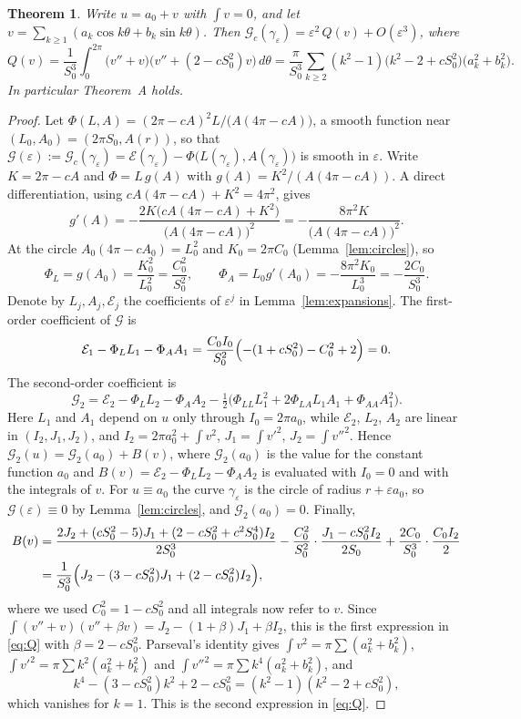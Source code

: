 \documentclass[11pt]{amsart}
\newtheorem{theorem}{Theorem}[section]
\theoremstyle{definition}
\theoremstyle{remark}
\numberwithin{equation}{section}
\newcommand{\eps}{\varepsilon}
\newcommand{\E}{\mathcal{E}}
\newcommand{\G}{\mathcal{G}}
\begin{document}
\begin{theorem}\label{thm:second}
Write $u=a_0+v$ with $\int v=0$, and let $v=\sum_{k\ge1}(a_k\cos k\theta+b_k\sin k\theta)$. Then $\G_c(\gamma_\eps)=\eps^2\,Q(v)+O(\eps^3)$, where
\begin{equation}\label{eq:Q}
Q(v)=\frac1{S_0^3}\int_0^{2\pi}\bigl(v''+v\bigr)\bigl(v''+(2-cS_0^2)v\bigr)\,d\theta
=\frac{\pi}{S_0^3}\sum_{k\ge2}(k^2-1)\bigl(k^2-2+cS_0^2\bigr)\bigl(a_k^2+b_k^2\bigr).
\end{equation}
In particular Theorem~A holds.
\end{theorem}

\begin{proof}
Let $\Phi(L,A)=(2\pi-cA)^2L/\bigl(A(4\pi-cA)\bigr)$, a smooth function near $(L_0,A_0)=(2\pi S_0,A(r))$, so that $\G(\eps):=\G_c(\gamma_\eps)=\E(\gamma_\eps)-\Phi\bigl(L(\gamma_\eps),A(\gamma_\eps)\bigr)$ is smooth in $\eps$. Write $K=2\pi-cA$ and $\Phi=L\,g(A)$ with $g(A)=K^2/(A(4\pi-cA))$. A direct differentiation, using $cA(4\pi-cA)+K^2=4\pi^2$, gives
\[
g'(A)=-\frac{2K\bigl(cA(4\pi-cA)+K^2\bigr)}{\bigl(A(4\pi-cA)\bigr)^2}=-\frac{8\pi^2K}{\bigl(A(4\pi-cA)\bigr)^2}.
\]
At the circle $A_0(4\pi-cA_0)=L_0^2$ and $K_0=2\pi C_0$ (Lemma~\ref{lem:circles}), so
\[
\Phi_L=g(A_0)=\frac{K_0^2}{L_0^2}=\frac{C_0^2}{S_0^2},\qquad \Phi_A=L_0g'(A_0)=-\frac{8\pi^2K_0}{L_0^3}=-\frac{2C_0}{S_0^3}.
\]
Denote by $L_j,A_j,\E_j$ the coefficients of $\eps^j$ in Lemma~\ref{lem:expansions}. The first-order coefficient of $\G$ is
\[
\E_1-\Phi_LL_1-\Phi_AA_1=\frac{C_0I_0}{S_0^2}\Bigl(-(1+cS_0^2)-C_0^2+2\Bigr)=0 .
\]
The second-order coefficient is
\[
\G_2=\E_2-\Phi_LL_2-\Phi_AA_2-\tfrac12\bigl(\Phi_{LL}L_1^2+2\Phi_{LA}L_1A_1+\Phi_{AA}A_1^2\bigr).
\]
Here $L_1$ and $A_1$ depend on $u$ only through $I_0=2\pi a_0$, while $\E_2$, $L_2$, $A_2$ are linear in $(I_2,J_1,J_2)$, and $I_2=2\pi a_0^2+\int v^2$, $J_1=\int v'^2$, $J_2=\int v''^2$. Hence $\G_2(u)=\G_2(a_0)+B(v)$, where $\G_2(a_0)$ is the value for the constant function $a_0$ and $B(v)=\E_2-\Phi_LL_2-\Phi_AA_2$ is evaluated with $I_0=0$ and with the integrals of $v$. For $u\equiv a_0$ the curve $\gamma_\eps$ is the circle of radius $r+\eps a_0$, so $\G(\eps)\equiv0$ by Lemma~\ref{lem:circles}, and $\G_2(a_0)=0$. Finally,
\begin{align*}
B(v)&=\frac{2J_2+(cS_0^2-5)J_1+(2-cS_0^2+c^2S_0^4)I_2}{2S_0^3}-\frac{C_0^2}{S_0^2}\cdot\frac{J_1-cS_0^2I_2}{2S_0}+\frac{2C_0}{S_0^3}\cdot\frac{C_0I_2}{2}\\
&=\frac{1}{S_0^3}\Bigl(J_2-(3-cS_0^2)J_1+(2-cS_0^2)I_2\Bigr),
\end{align*}
where we used $C_0^2=1-cS_0^2$ and all integrals now refer to $v$. Since $\int(v''+v)(v''+\beta v)=J_2-(1+\beta)J_1+\beta I_2$, this is the first expression in \eqref{eq:Q} with $\beta=2-cS_0^2$. Parseval's identity gives $\int v^2=\pi\sum(a_k^2+b_k^2)$, $\int v'^2=\pi\sum k^2(a_k^2+b_k^2)$ and $\int v''^2=\pi\sum k^4(a_k^2+b_k^2)$, and
\[
k^4-(3-cS_0^2)k^2+2-cS_0^2=(k^2-1)(k^2-2+cS_0^2),
\]
which vanishes for $k=1$. This is the second expression in \eqref{eq:Q}.
\end{proof}
\end{document}
